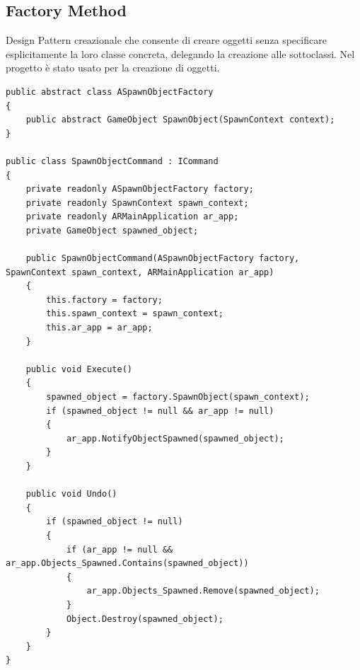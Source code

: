 \subsection{Factory Method}
Design Pattern creazionale che consente di creare oggetti senza specificare esplicitamente la loro classe concreta, delegando la creazione alle sottoclassi. Nel progetto è stato usato per la creazione di oggetti.
\begin{lstlisting}[language={[Sharp]C}]
public abstract class ASpawnObjectFactory
{
    public abstract GameObject SpawnObject(SpawnContext context);
}

public class SpawnObjectCommand : ICommand
{
    private readonly ASpawnObjectFactory factory;
    private readonly SpawnContext spawn_context;
    private readonly ARMainApplication ar_app;
    private GameObject spawned_object;

    public SpawnObjectCommand(ASpawnObjectFactory factory, SpawnContext spawn_context, ARMainApplication ar_app)
    {
        this.factory = factory;
        this.spawn_context = spawn_context;
        this.ar_app = ar_app;
    }

    public void Execute()
    {
        spawned_object = factory.SpawnObject(spawn_context);
        if (spawned_object != null && ar_app != null)
        {
            ar_app.NotifyObjectSpawned(spawned_object);
        }
    }

    public void Undo()
    {
        if (spawned_object != null)
        {
            if (ar_app != null && ar_app.Objects_Spawned.Contains(spawned_object))
            {
                ar_app.Objects_Spawned.Remove(spawned_object);
            }
            Object.Destroy(spawned_object);
        }
    }
}
\end{lstlisting}



